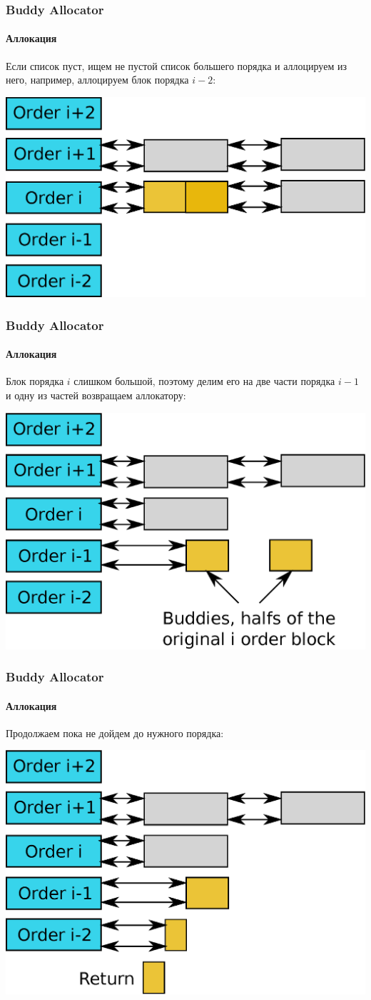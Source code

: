\begin{frame}
\frametitle{Buddy Allocator}
\framesubtitle{Аллокация}

Если список пуст, ищем не пустой список большего порядка и аллоцируем из него, например, аллоцируем блок порядка $i-2$:

\includegraphics[width=.8\linewidth]{buddy-alloc1}

\end{frame}

\begin{frame}
\frametitle{Buddy Allocator}
\framesubtitle{Аллокация}

Блок порядка $i$ слишком большой, поэтому делим его на две части порядка $i-1$ и одну из частей возвращаем аллокатору:

\includegraphics[width=.8\linewidth]{buddy-alloc2}

\end{frame}

\begin{frame}
\frametitle{Buddy Allocator}
\framesubtitle{Аллокация}

Продолжаем пока не дойдем до нужного порядка:

\includegraphics[width=.8\linewidth]{buddy-alloc3}

\end{frame}

